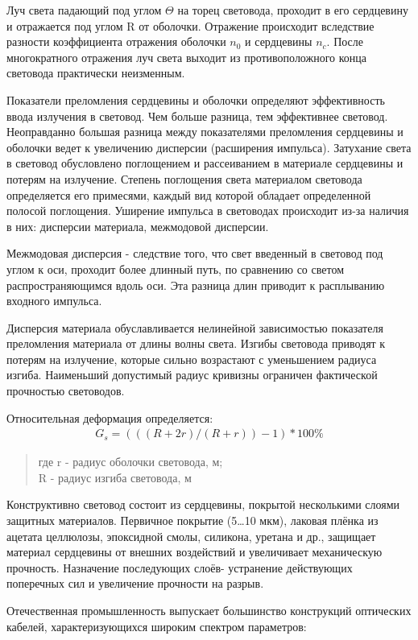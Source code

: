 \documentclass[unicode, 12pt, a4paper, oneside]{article}
\begin{document}
Луч света падающий под углом $\Theta$ на торец световода, проходит в его сердцевину и отражается под углом R от оболочки. Отражение происходит вследствие разности коэффициента отражения оболочки $n_{0}$ и сердцевины $n_{c}$. После многократного отражения луч света выходит из противоположного конца световода практически неизменным.

Показатели преломления сердцевины и оболочки определяют эффективность ввода излучения в световод. Чем больше разница, тем эффективнее световод. Неоправданно большая разница между показателями преломления сердцевины и оболочки ведет к увеличению дисперсии (расширения импульса). Затухание света в световод обусловлено поглощением и рассеиванием в материале сердцевины и потерям на излучение. Степень поглощения света материалом световода определяется его примесями, каждый вид которой обладает определенной полосой поглощения. Уширение импульса в световодах происходит из-за наличия в них: дисперсии материала, межмодовой дисперсии.
 
Межмодовая дисперсия - следствие того, что свет введенный в световод под углом к оси, проходит более длинный путь, по сравнению со светом распространяющимся вдоль оси. Эта разница длин приводит к расплыванию входного импульса.

Дисперсия материала обуславливается нелинейной зависимостью показателя преломления материала от длины волны света. Изгибы световода приводят к потерям на излучение, которые сильно возрастают с уменьшением радиуса изгиба. Наименьший допустимый радиус кривизны ограничен фактической прочностью световодов.

Относительная деформация определяется:
\begin{eqnarray}
G_{s}=(((R+2r)/(R+r))-1)*100\%
\end{eqnarray}
\begin{verse}
где  r - радиус оболочки световода, м;\\
R - радиус изгиба световода, м\\
\end{verse}

Конструктивно световод состоит из сердцевины, покрытой несколькими слоями защитных материалов. Первичное покрытие (5…10 мкм), лаковая плёнка из ацетата целлюлозы, эпоксидной смолы, силикона, уретана и др., защищает материал сердцевины от внешних воздействий и увеличивает механическую прочность. Назначение последующих слоёв- устранение действующих поперечных сил и увеличение прочности на разрыв.

Отечественная промышленность выпускает большинство конструкций оптических кабелей, характеризующихся широким спектром параметров:
\end{document}
